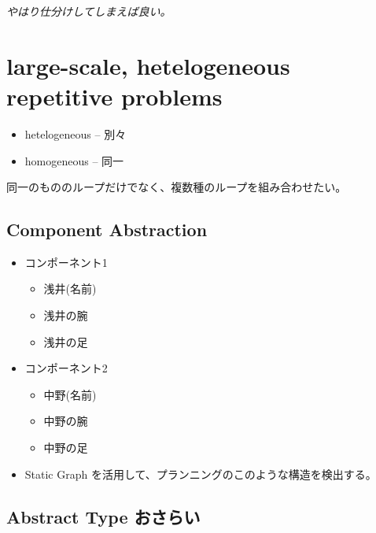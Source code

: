 \emph{やはり仕分けしてしまえば良い。}

\section{large-scale, hetelogeneous repetitive problems}
\label{sec-2}

\begin{itemize}
\item hetelogeneous -- 別々
\item homogeneous -- 同一
\end{itemize}

同一のもののループだけでなく、複数種のループを組み合わせたい。

\subsection{Component Abstraction}
\label{sec-2-1}

\begin{container-fluid}
\begin{row-fluid}
\begin{span6}
\begin{itemize}
\item コンポーネント1
\begin{itemize}
\item 浅井(名前)
\item 浅井の腕
\item 浅井の足
\end{itemize}
\item コンポーネント2
\begin{itemize}
\item 中野(名前)
\item 中野の腕
\item 中野の足
\end{itemize}
\end{itemize}
\end{span6}
\begin{span6}
\begin{itemize}
\item Static Graph を活用して、プランニングのこのような構造を検出する。
\end{itemize}
\end{span6}
\end{row-fluid}
\end{container-fluid}

\subsection{Abstract Type おさらい}
\label{sec-2-2}


